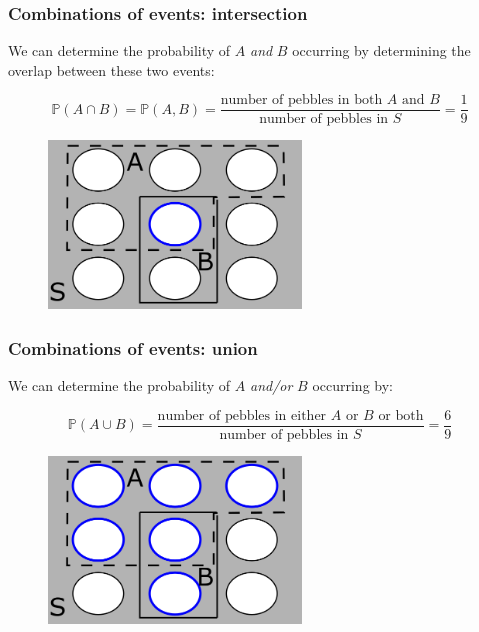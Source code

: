 \documentclass{beamer}
\begin{document}
	\begin{frame}
		\frametitle{Combinations of events: intersection}
		
		We can determine the probability of $A$ \textit{and} $B$ occurring by determining the overlap between these two events:
		
		\begin{equation}
			\mathbb{P}(A \cap  B) = \mathbb{P}(A, B) = \frac{\text{number of pebbles in both } A \text{ and } B}{\text{number of pebbles in } S} = \frac{1}{9}
		\end{equation}
		
		\begin{figure}[ht]
			\centerline{\includegraphics[width=0.6\textwidth]{./figures/pebble_world_and.png}}
		\end{figure}
		
	\end{frame}

	\begin{frame}
		\frametitle{Combinations of events: union}
		
		We can determine the probability of $A$ \textit{and/or} $B$ occurring by:
		
		\begin{equation}
			\mathbb{P}(A \cup B) = \frac{\text{number of pebbles in either } A \text{ or } B \text{ or both}}{\text{number of pebbles in } S} = \frac{6}{9}
		\end{equation}
	
	\begin{figure}[ht]
		\centerline{\includegraphics[width=0.6\textwidth]{./figures/pebble_world_or.png}}
	\end{figure}
		
	\end{frame}
	
\end{document}

